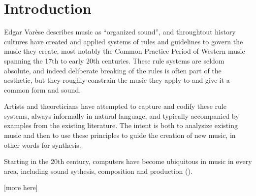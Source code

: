 \section{Introduction}
\label{sec:intro}

Edgar Var\`{e}se describes music as ``organized sound'', and
throughtout history cultures have created and applied systems of rules
and guidelines to govern the music they create, most notably the
Common Practice Period of Western music spanning the 17th to early
20th centuries. These rule systems are seldom absolute, and indeed
deliberate breaking of the rules is often part of the aesthetic, but they
roughly constrain the music they apply to and give it a common form
and sound.

Artists and theoreticians have attempted to capture and codify these
rule systems, always informally in natural language, and typically
accompanied by examples from the existing literature. The intent is
both to analysize existing music and then to use these principles to
guide the creation of new music, in other words for synthesis.

Starting in the 20th century, computers have become ubiquitous in
music in every area, including sound sythesis, composition and
production (\citep{roads-tutorial}).

[more here]

